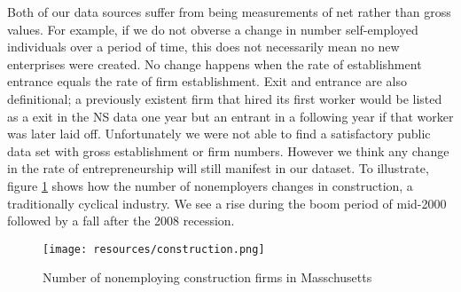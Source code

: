 \documentclass[12pt]{article}
\begin{document}
\begin{comment}

Our second source of data is the Census Country Business Patterns (CBP). The CBP is an annual series based on the Census Business Register, a dataset of US firms that is continuously updated using multiple methods including surveys and tax reporting. The CBP provides country level information on for example the industry, sales and employee count of establishments. It excludes businesses with no paid employees. As shown in Figure \ref{fig:firm_est}, establishments closely track firms. Although we are primarily interested in new firm creation, the census does not publicly provide firm level data at the industry level per county. We use establishments of 1 to 4 employees (small establishments) as a proxy for entrepreneurial firms. 

\begin{figure}[H]
	\centering
	\texttt{[image: resources/firm\_est\_MA.eps]}
	\caption{Number of firms and establishments in Massachusetts with 1 to 4 employees}
	\label{fig:firm_est}
\end{figure}

Our third source of data is the Nonemployer Statistics series. The NS is based on tax filings. It includes self-employed individuals as well incorporated businesses and partnerships that lack employees. 

\end{comment}

Both of our data sources suffer from being measurements of net rather than gross values. For example, if  we do not obverse a change in number self-employed individuals over a period of time, this does not necessarily mean no new enterprises were created. No change happens when the rate of establishment entrance equals the rate of firm establishment. Exit and entrance are also definitional; a previously existent firm that hired its first worker would be listed as a exit in the NS data one year but an entrant in a following year if that worker was later laid off. Unfortunately we were not able to find a satisfactory public data set with gross establishment or firm numbers. However we think any change in the rate of entrepreneurship will still manifest in our dataset. To illustrate, figure \ref{fig:construct} shows how the number of nonemployers changes in construction, a traditionally cyclical industry. We see a rise during the boom period of mid-2000 followed by a fall after the 2008 recession. 

\begin{figure}[H]
	\centering
	\texttt{[image: resources/construction.png]}
	\caption{Number of nonemploying construction firms in Masschusetts}
	\label{fig:construct}
\end{figure}
\end{document}
